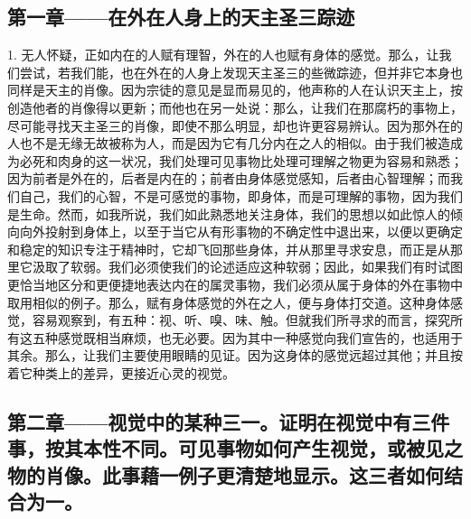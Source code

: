 
\subsection{第一章——在外在人身上的天主圣三踪迹}

1. 无人怀疑，正如内在的人赋有理智，外在的人也赋有身体的感觉。那么，让我们尝试，若我们能，也在外在的人身上发现天主圣三的些微踪迹，但并非它本身也同样是天主的肖像。因为宗徒的意见是显而易见的，他声称的人在认识天主上，按创造他者的肖像得以更新；而他也在另一处说：那么，让我们在那腐朽的事物上，尽可能寻找天主圣三的肖像，即使不那么明显，却也许更容易辨认。因为那外在的人也不是无缘无故被称为人，而是因为它有几分内在之人的相似。由于我们被造成为必死和肉身的这一状况，我们处理可见事物比处理可理解之物更为容易和熟悉；因为前者是外在的，后者是内在的；前者由身体感觉感知，后者由心智理解；而我们自己，我们的心智，不是可感觉的事物，即身体，而是可理解的事物，因为我们是生命。然而，如我所说，我们如此熟悉地关注身体，我们的思想以如此惊人的倾向向外投射到身体上，以至于当它从有形事物的不确定性中退出来，以便以更确定和稳定的知识专注于精神时，它却飞回那些身体，并从那里寻求安息，而正是从那里它汲取了软弱。我们必须使我们的论述适应这种软弱；因此，如果我们有时试图更恰当地区分和更便捷地表达内在的属灵事物，我们必须从属于身体的外在事物中取用相似的例子。那么，赋有身体感觉的外在之人，便与身体打交道。这种身体感觉，容易观察到，有五种：视、听、嗅、味、触。但就我们所寻求的而言，探究所有这五种感觉既相当麻烦，也无必要。因为其中一种感觉向我们宣告的，也适用于其余。那么，让我们主要使用眼睛的见证。因为这身体的感觉远超过其他；并且按着它种类上的差异，更接近心灵的视觉。\par


\subsection{第二章——视觉中的某种三一。证明在视觉中有三件事，按其本性不同。可见事物如何产生视觉，或被见之物的肖像。此事藉一例子更清楚地显示。这三者如何结合为一。}

